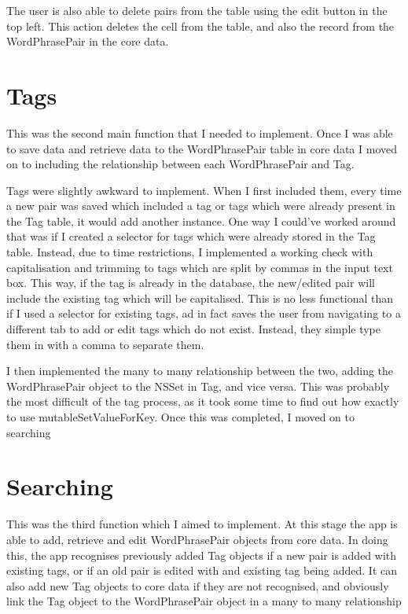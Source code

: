 \documentclass[11pt]{article}
\begin{document}
The user is also able to delete pairs from the table using the edit button in the top left. This action deletes the cell from the table, and also the record from the WordPhrasePair in the core data.

\section{Tags}
This was the second main function that I needed to implement. Once I was able to save data and retrieve data to the WordPhrasePair table in core data I moved on to including the relationship between each WordPhrasePair and Tag.

Tags were slightly awkward to implement. When I first included them, every time a new pair was saved which included a tag or tags which were already present in the Tag table, it would add another instance. One way I could've worked around that was if I created a selector for tags which were already stored in the Tag table. Instead, due to time restrictions, I implemented a working check with capitalisation and trimming to tags which are split by commas in the input text box. This way, if the tag is already in the database, the new/edited pair will include the existing tag which will be capitalised. This is no less functional than if I used a selector for existing tags, ad in fact saves the user from navigating to a different tab to add or edit tags which do not exist. Instead, they simple type them in with a comma to separate them.

I then implemented the many to many relationship between the two, adding the WordPhrasePair object to the NSSet in Tag, and vice versa. This was probably the most difficult of the tag process, as it took some time to find out how exactly to use mutableSetValueForKey. Once this was completed, I moved on to searching

\section{Searching}
This was the third function which I aimed to implement. At this stage the app is able to add, retrieve and edit WordPhrasePair objects from core data. In doing this, the app recognises previously added Tag objects if a new pair is added with existing tags, or if an old pair is edited with and existing tag being added. It can also add new Tag objects to core data if they are not recognised, and obviously link the Tag object to the WordPhrasePair object in a many to many relationship
\end{document}
